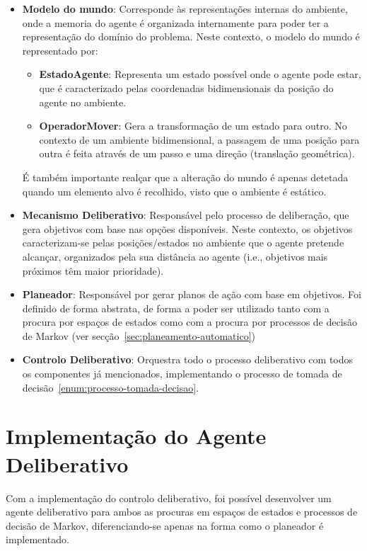 \begin{itemize}
    \item \textbf{Modelo do mundo}: Corresponde às representações internas do ambiente, onde a memoria do agente é organizada internamente para poder ter a representação do domínio do problema.
    Neste contexto, o modelo do mundo é representado por:
    \begin{itemize}
        \item \textbf{EstadoAgente}: Representa um estado possível onde o agente pode estar, que é
        caracterizado pelas coordenadas bidimensionais da posição do agente no ambiente.
        \item \textbf{OperadorMover}: Gera a transformação de um estado para outro.
        No contexto de um ambiente bidimensional, a passagem de uma posição para outra é feita através de um passo e uma direção (translação geométrica).
    \end{itemize}
    É também importante realçar que a alteração do mundo é apenas detetada quando um elemento alvo é recolhido, visto que o ambiente é estático.
    \item \textbf{Mecanismo Deliberativo}: Responsável pelo processo de deliberação, que gera objetivos com base nas opções disponíveis.
    Neste contexto, os objetivos caracterizam-se pelas posições/estados no ambiente que o agente pretende alcançar, organizados pela sua distância ao agente (i.e., objetivos mais próximos têm maior prioridade).
    \item \textbf{Planeador}: Responsável por gerar planos de ação com base em objetivos.
    Foi definido de forma abstrata, de forma a poder ser utilizado tanto com a procura por espaços de estados como com a procura por processos de decisão de Markov (ver secção~\ref{sec:planeamento-automatico})
    \item \textbf{Controlo Deliberativo}: Orquestra todo o processo deliberativo com todos os componentes já mencionados, implementando o processo de tomada de decisão~\ref{enum:processo-tomada-decisao}.
\end{itemize}


\section{Implementação do Agente Deliberativo}\label{sec:implementacao-agente-deliberativo}

Com a implementação do controlo deliberativo, foi possível desenvolver um agente deliberativo para ambos as procuras em espaços de estados e processos de decisão de Markov, diferenciando-se apenas na forma como o planeador é implementado.

